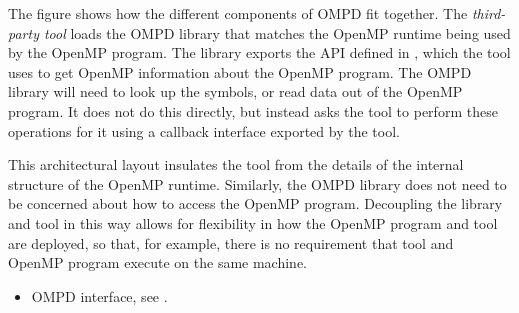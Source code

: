 The figure shows how the different components of OMPD fit together. The \emph{third-party tool} loads
the OMPD library
that matches the OpenMP runtime being used by the OpenMP program. The
library exports the API defined in
, which the tool uses to get
OpenMP information about the
OpenMP program. The OMPD
library will need to look up the symbols, or read data out of the
OpenMP program. It does not do this directly,
but instead asks the tool to perform these operations
for it using a callback interface exported
by the tool.

This architectural layout insulates the tool from the details of the
internal structure of the
OpenMP runtime. Similarly, the OMPD library does not need to be
concerned about how to access
the OpenMP program. Decoupling the library and tool in this
way allows for flexibility in how the OpenMP program and tool are deployed, so that, for example,
there is no requirement that tool and OpenMP program
execute on the same machine.

\crossreferences
\begin{itemize}
\item OMPD interface, see .
\end{itemize}

